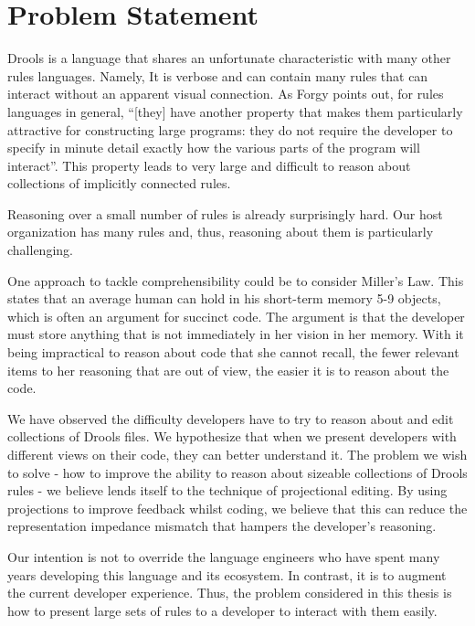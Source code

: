 \section{Problem Statement}

Drools is a language that shares an unfortunate characteristic with many other rules languages.
Namely, It is verbose and can contain many rules that can interact without an apparent visual connection.
As Forgy\cite{forgy1989rete} points out, for rules languages in general, ``[they] have another property that makes them particularly attractive for constructing large programs: they do not require the developer to specify in minute detail exactly how the various parts of the program will interact''.
This property leads to very large and difficult to reason about collections of implicitly connected rules.

Reasoning over a small number of rules is already surprisingly hard.
Our host organization has many rules and, thus, reasoning about them is particularly challenging.

One approach to tackle comprehensibility could be to consider Miller's Law\cite{miller1956magical}.
This states that an average human can hold in his short-term memory 5-9 objects, which is often an argument for succinct code.
The argument is that the developer must store anything that is not immediately in her vision in her memory.
With it being impractical to reason about code that she cannot recall, the fewer relevant items to her reasoning that are out of view, the easier it is to reason about the code.

We have observed the difficulty developers have to try to reason about and edit collections of Drools files.
We hypothesize that when we present developers with different views on their code, they can better understand it.
The problem we wish to solve - how to improve the ability to reason about sizeable collections of Drools rules - we believe lends itself to the technique of projectional editing.
By using projections to improve feedback whilst coding, we believe that this can reduce the representation impedance mismatch that hampers the developer's reasoning.

Our intention is not to override the language engineers who have spent many years developing this language and its ecosystem.
In contrast, it is to augment the current developer experience.
Thus, the problem considered in this thesis is how to present large sets of rules to a developer to interact with them easily. 